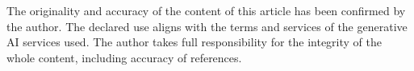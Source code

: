 \documentclass[12pt,a4paper]{article}
\begin{document}
The originality and accuracy of the content of this article has been confirmed by the author. The declared use aligns with the terms and services of the generative AI services used. The author takes full responsibility for the integrity of the whole content, including accuracy of references.

\dobibliography

\listoffigures
\listoftables
\end{document}
